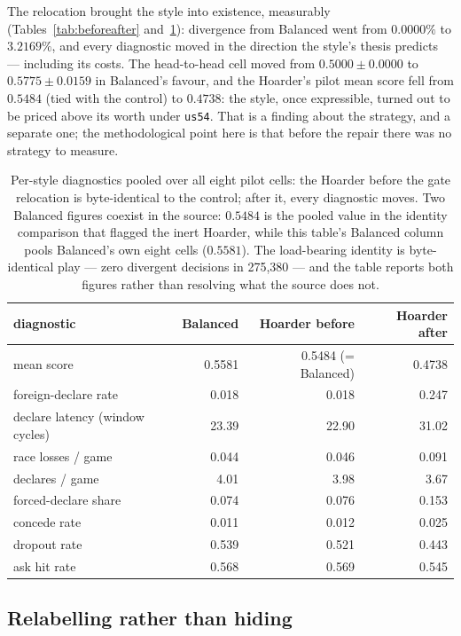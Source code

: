 \documentclass[11pt]{article}
\newcommand{\code}[1]{\texttt{#1}}
\begin{document}
The relocation brought the style into existence, measurably
(Tables~\ref{tab:beforeafter} and~\ref{tab:diagnostics}): divergence from Balanced went from
$0.0000\%$ to $3.2169\%$, and every diagnostic moved in the direction the style's thesis
predicts --- including its costs. The head-to-head cell moved from $0.5000 \pm 0.0000$ to
$0.5775 \pm 0.0159$ in Balanced's favour, and the Hoarder's pilot mean score fell from $0.5484$
(tied with the control) to $0.4738$: the style, once expressible, turned out to be priced above
its worth under \code{us54}. That is a finding about the strategy, and a separate one; the
methodological point here is that before the repair there was no strategy to measure.

\begin{table}[ht]
\centering
\caption{Per-style diagnostics pooled over all eight pilot cells: the Hoarder before the gate
relocation is byte-identical to the control; after it, every diagnostic moves. Two Balanced
figures coexist in the source: $0.5484$ is the pooled value in the identity comparison that
flagged the inert Hoarder, while this table's Balanced column pools Balanced's own eight cells
($0.5581$). The load-bearing identity is byte-identical play --- zero divergent decisions in
275{,}380 --- and the table reports both figures rather than resolving what the source does
not.}
\label{tab:diagnostics}
\small
\begin{tabular}{lrrr}
\toprule
diagnostic & Balanced & Hoarder before & Hoarder after \\
\midrule
mean score & 0.5581 & 0.5484 (= Balanced) & 0.4738 \\
foreign-declare rate & 0.018 & 0.018 & 0.247 \\
declare latency (window cycles) & 23.39 & 22.90 & 31.02 \\
race losses / game & 0.044 & 0.046 & 0.091 \\
declares / game & 4.01 & 3.98 & 3.67 \\
forced-declare share & 0.074 & 0.076 & 0.153 \\
concede rate & 0.011 & 0.012 & 0.025 \\
dropout rate & 0.539 & 0.521 & 0.443 \\
ask hit rate & 0.568 & 0.569 & 0.545 \\
\bottomrule
\end{tabular}
\end{table}

\subsection{Relabelling rather than hiding}
\end{document}
